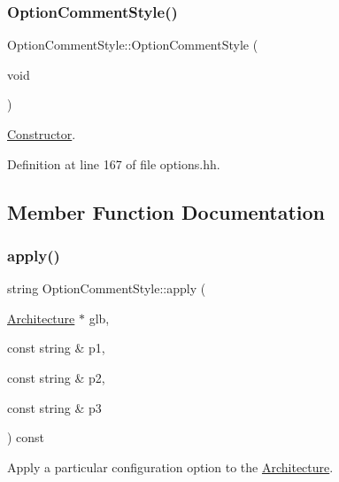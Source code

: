 \subsubsection{\texorpdfstring{OptionCommentStyle()}{OptionCommentStyle()}}
{\footnotesize\ttfamily Option\+Comment\+Style\+::\+Option\+Comment\+Style (\begin{DoxyParamCaption}\item[{void}]{ }\end{DoxyParamCaption})\hspace{0.3cm}{\ttfamily [inline]}}



\mbox{\hyperlink{class_constructor}{Constructor}}. 



Definition at line 167 of file options.\+hh.



\subsection{Member Function Documentation}
\mbox{\label{class_option_comment_style_a7371a6222646b1c3e16c3474c0c62b1b}} 
\subsubsection{\texorpdfstring{apply()}{apply()}}
{\footnotesize\ttfamily string Option\+Comment\+Style\+::apply (\begin{DoxyParamCaption}\item[{\mbox{\hyperlink{class_architecture}{Architecture}} $\ast$}]{glb,  }\item[{const string \&}]{p1,  }\item[{const string \&}]{p2,  }\item[{const string \&}]{p3 }\end{DoxyParamCaption}) const\hspace{0.3cm}{\ttfamily [virtual]}}



Apply a particular configuration option to the \mbox{\hyperlink{class_architecture}{Architecture}}. 


